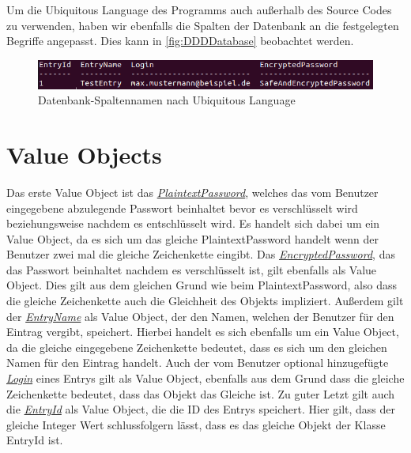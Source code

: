 Um die Ubiquitous Language des Programms auch außerhalb des Source Codes zu verwenden, haben wir ebenfalls die Spalten der Datenbank an die festgelegten Begriffe angepasst. Dies kann in \autoref{fig:DDDDatabase} beobachtet werden.

\begin{figure}[ht]
	\centering
	\includegraphics[width=1.0\textwidth]{Bilder/DDD_column_names.png}
	\caption{Datenbank-Spaltennamen nach Ubiquitous Language}
	\label{fig:DDDDatabase}
\end{figure}

\section{Value Objects}
Das erste Value Object ist das \href{https://github.com/moorts/Morik/blob/main/src/application/DDD/PlaintextPassword.h}{\textit{PlaintextPassword}}, welches das vom Benutzer eingegebene abzulegende Passwort beinhaltet bevor es verschlüsselt wird beziehungsweise nachdem es entschlüsselt wird. Es handelt sich dabei um ein Value Object, da es sich um das gleiche PlaintextPassword handelt wenn der Benutzer zwei mal die gleiche Zeichenkette eingibt. Das \href{https://github.com/moorts/Morik/blob/main/src/application/DDD/EncryptedPassword.h}{\textit{EncryptedPassword}}, das das Passwort beinhaltet nachdem es verschlüsselt ist, gilt ebenfalls als Value Object. Dies gilt aus dem gleichen Grund wie beim PlaintextPassword, also dass die gleiche Zeichenkette auch die Gleichheit des Objekts impliziert. Außerdem gilt der \href{https://github.com/moorts/Morik/blob/main/src/application/DDD/EntryName.h}{\textit{EntryName}} als Value Object, der den Namen, welchen der Benutzer für den Eintrag vergibt, speichert. Hierbei handelt es sich ebenfalls um ein Value Object, da die gleiche eingegebene Zeichenkette bedeutet, dass es sich um den gleichen Namen für den Eintrag handelt. Auch der vom Benutzer optional hinzugefügte \href{https://github.com/moorts/Morik/blob/main/src/application/DDD/Login.h}{\textit{Login}} eines Entrys gilt als Value Object, ebenfalls aus dem Grund dass die gleiche Zeichenkette bedeutet, dass das Objekt das Gleiche ist. Zu guter Letzt gilt auch die \href{https://github.com/moorts/Morik/blob/main/src/application/DDD/EntryId.h}{\textit{EntryId}} als Value Object, die die ID des Entrys speichert. Hier gilt, dass der gleiche Integer Wert schlussfolgern lässt, dass es das gleiche Objekt der Klasse EntryId ist.

